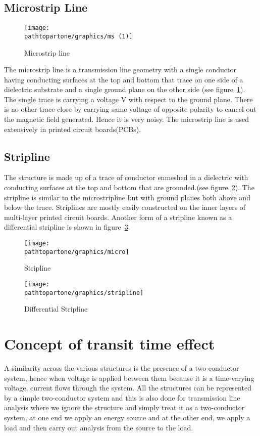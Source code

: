 \subsection{Microstrip Line}
\begin{figure}[h]
\centering
\texttt{[image: \\pathtopartone/graphics/ms (1)]}
\caption{Microstrip line}
\label{fig:micro}
\end{figure}

The microstrip line is a transmission line geometry with a single conductor having conducting surfaces at the top and bottom that trace on one side of a dielectric substrate and a single ground plane on the other side (see figure~\ref{fig:micro}). The single trace is carrying a voltage V with respect to the ground plane. There is no other trace close by carrying same voltage of opposite polarity to cancel out the magnetic field generated. Hence it is very noisy. The microstrip line is used extensively in printed circuit boards(PCBs).

\subsection{Stripline} 
The structure is made up of a trace of conductor enmeshed in a dielectric with conducting surfaces at the top and bottom that are grounded.(see figure~\ref{fig:stripline}). The stripline is similar to the microstripline but with ground planes both above and below the trace. Striplines are mostly easily constructed on the inner layers of multi-layer printed circuit boards. Another form of a stripline known as a differential stripline is shown in figure~\ref{fig:diff-stripline}.
\begin{figure}[h]
\centering
\texttt{[image: \\pathtopartone/graphics/micro]}
\caption{Stripline}
\label{fig:stripline}
\end{figure}

\begin{figure}[h]
\centering
\texttt{[image: \\pathtopartone/graphics/stripline]}
\caption{Differential Stripline}
\label{fig:diff-stripline}
\end{figure}

\section{Concept of transit time effect}
A similarity across the various structures is the presence of a two-conductor system, hence when voltage is applied between them because it is a time-varying voltage, current flows through the system. All the structures can be represented by a simple two-conductor system and this is also done for transmission line analysis where we ignore the structure and simply treat it as a two-conductor system, at one end we apply an energy source and at the other end, we apply a load and then carry out analysis from the source to the load.

